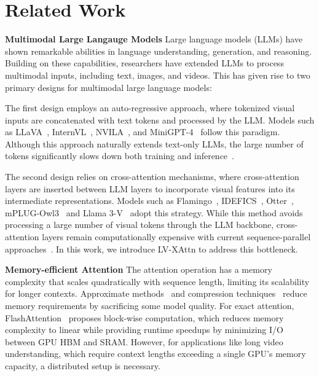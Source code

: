 \section{Related Work}
\textbf{Multimodal Large Langauge Models} Large language models (LLMs) have shown remarkable abilities in language understanding, generation, and reasoning. Building on these capabilities, researchers have extended LLMs to process multimodal inputs, including text, images, and videos. This has given rise to two primary designs for multimodal large language models:

The first design employs an auto-regressive approach, where tokenized visual inputs are concatenated with text tokens and processed by the LLM. Models such as LLaVA~\cite{liu2023llava}, InternVL~\cite{chen2024internvl}, NVILA~\cite{liu2024nvila}, and MiniGPT-4~\cite{zhu2024minigpt} follow this paradigm. Although this approach naturally extends text-only LLMs, the large number of tokens significantly slows down both training and inference~\cite{ye2024mplugowl3, grattafiori2024llama3v}.

The second design relies on cross-attention mechanisms, where cross-attention layers are inserted between LLM layers to incorporate visual features into its intermediate representations. Models such as Flamingo~\cite{alayrac2022flamingo}, IDEFICS~\cite{laurencon2023idefics}, Otter~\cite{li2023otter}, mPLUG-Owl3~\cite{ye2024mplugowl3} and Llama 3-V~\cite{grattafiori2024llama3v} adopt this strategy. While this method avoids processing a large number of visual tokens through the LLM backbone, cross-attention layers remain computationally expensive with current sequence-parallel approaches~\cite{grattafiori2024llama3v}. In this work, we introduce LV-XAttn to address this bottleneck.

\textbf{Memory-efficient Attention} The attention operation has a memory complexity that scales quadratically with sequence length, limiting its scalability for longer contexts. Approximate methods~\cite{kitaev2020reformer, zaheer2020bigbird, beltagy2020longformer, choromanski2021performer, ding2023longnet} and compression techniques~\cite{chevalier2023autocompressors, munkhdalai2024infini-attention} reduce memory requirements by sacrificing some model quality. For exact attention, FlashAttention~\cite{dao2022fa, dao2023fa2} proposes block-wise computation, which reduces memory complexity to linear while providing runtime speedups by minimizing I/O between GPU HBM and SRAM. However, for applications like long video understanding, which require context lengths exceeding a single GPU's memory capacity, a distributed setup is necessary.

